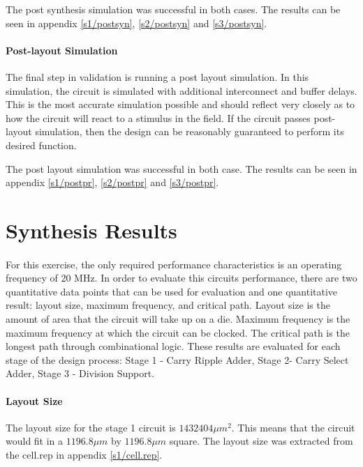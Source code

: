 \documentclass[11pt,letterpaper,final]{article}
\begin{document}
The post synthesis simulation was successful in both cases. The results can be seen in appendix \ref{s1/postsyn}, \ref{s2/postsyn} and \ref{s3/postsyn}.

\paragraph{ Post-layout Simulation }
The final step in validation is running a post layout simulation.  In this simulation, the circuit is simulated with additional interconnect and buffer delays.  This is the most accurate simulation possible and should reflect very closely as to how the circuit will react to a stimulus in the field.  If the circuit passes post-layout simulation, then the design can be reasonably guaranteed to perform its desired function.

The post layout simulation was successful in both case.  The results can be seen in appendix \ref{s1/postpr}, \ref{s2/postpr} and \ref{s3/postpr}.

\section{ Synthesis Results }
\paragraph{}

For this exercise, the only required performance characteristics is an operating frequency of 20 MHz.  In order to evaluate this circuits performance, there are two quantitative data points that can be used for evaluation and one quantitative result: layout size, maximum frequency, and critical path.  Layout size is the amount of area that the circuit will take up on a die. Maximum frequency is the maximum frequency at which the circuit can be clocked.  The critical path is the longest path through combinational logic.  These results are evaluated for each stage of the design process: Stage 1 - Carry Ripple Adder, Stage 2- Carry Select Adder, Stage 3 - Division Support.

\paragraph{ Layout Size }
The layout size for the stage 1 circuit is $ 1432404 \mu m^2$.  This means that the circuit would fit in a $ 1196.8 \mu m $ by $ 1196.8 \mu m $ square. The layout size was extracted from the cell.rep in appendix \ref{s1/cell.rep}.
\end{document}
